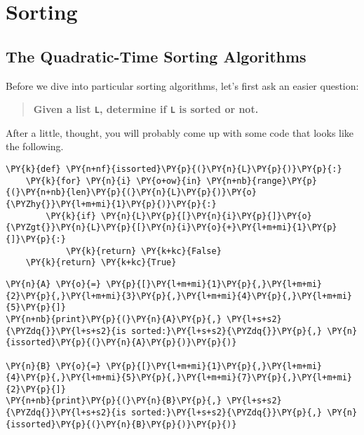 \chapter{Sorting}

\section{The Quadratic-Time Sorting Algorithms}


Before we dive into particular sorting algorithms, let's first ask an easier question:

\begin{quote}

\textbf{Given a list \texttt{L}, determine if \texttt{L} is sorted or not.}

\end{quote}

After a little, thought, you will probably come up with some code that looks like the following.

\begin{Verbatim}[commandchars=\\\{\}]
\PY{k}{def} \PY{n+nf}{issorted}\PY{p}{(}\PY{n}{L}\PY{p}{)}\PY{p}{:}
    \PY{k}{for} \PY{n}{i} \PY{o+ow}{in} \PY{n+nb}{range}\PY{p}{(}\PY{n+nb}{len}\PY{p}{(}\PY{n}{L}\PY{p}{)}\PY{o}{\PYZhy{}}\PY{l+m+mi}{1}\PY{p}{)}\PY{p}{:}
        \PY{k}{if} \PY{n}{L}\PY{p}{[}\PY{n}{i}\PY{p}{]}\PY{o}{\PYZgt{}}\PY{n}{L}\PY{p}{[}\PY{n}{i}\PY{o}{+}\PY{l+m+mi}{1}\PY{p}{]}\PY{p}{:}
            \PY{k}{return} \PY{k+kc}{False}
    \PY{k}{return} \PY{k+kc}{True}
\end{Verbatim}


\begin{Verbatim}[commandchars=\\\{\}]
\PY{n}{A} \PY{o}{=} \PY{p}{[}\PY{l+m+mi}{1}\PY{p}{,}\PY{l+m+mi}{2}\PY{p}{,}\PY{l+m+mi}{3}\PY{p}{,}\PY{l+m+mi}{4}\PY{p}{,}\PY{l+m+mi}{5}\PY{p}{]}
\PY{n+nb}{print}\PY{p}{(}\PY{n}{A}\PY{p}{,} \PY{l+s+s2}{\PYZdq{}}\PY{l+s+s2}{is sorted:}\PY{l+s+s2}{\PYZdq{}}\PY{p}{,} \PY{n}{issorted}\PY{p}{(}\PY{n}{A}\PY{p}{)}\PY{p}{)}

\PY{n}{B} \PY{o}{=} \PY{p}{[}\PY{l+m+mi}{1}\PY{p}{,}\PY{l+m+mi}{4}\PY{p}{,}\PY{l+m+mi}{5}\PY{p}{,}\PY{l+m+mi}{7}\PY{p}{,}\PY{l+m+mi}{2}\PY{p}{]}
\PY{n+nb}{print}\PY{p}{(}\PY{n}{B}\PY{p}{,} \PY{l+s+s2}{\PYZdq{}}\PY{l+s+s2}{is sorted:}\PY{l+s+s2}{\PYZdq{}}\PY{p}{,} \PY{n}{issorted}\PY{p}{(}\PY{n}{B}\PY{p}{)}\PY{p}{)}
\end{Verbatim}



